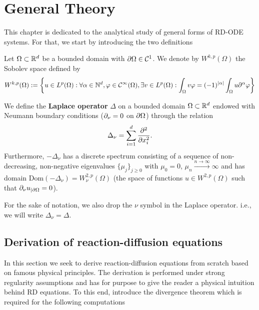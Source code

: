 \section{General Theory}

This chapter is dedicated to the analytical study of general forms of RD-ODE systems. For that, we start by introducing the two definitions

\begin{definition}
	Let $\Omega \subset \mathbb{R}^d$ be a bounded domain with $\partial \Omega \in \mathcal C^1$. We denote by $W^{k, p}(\Omega)$ the Sobolev space defined by
	$$W^{k, p}(\Omega) := \left\{ u \in L^p(\Omega) : \forall \alpha \in \mathbb{N}^d, \varphi \in \mathcal C^\infty(\Omega), \exists v \in L^p(\Omega) : \int_\Omega v \varphi = (-1)^{|\alpha|} \int_\Omega u \partial^\alpha \varphi \right\}$$   
\end{definition}

\begin{definition}
	
	We define the \textbf{Laplace operator}  $\Delta$ on a bounded domain $\Omega \subset \mathbb{R}^d$ endowed with Neumann boundary conditions ($\partial_{\nu} = 0$ on $\partial\Omega$) through the relation
	$$\Delta_\nu = \sum_{i=1}^d \frac{\partial^2}{\partial x_i^2}.$$
	Furthermore, $-\Delta_\nu$ has a discrete spectrum consisting of a sequence of non-decreasing, non-negative eigenvalues 
	$\{\mu_j\}_{j\ge 0}$ with $\mu_0 = 0$, $\mu_n \xrightarrow{n \to \infty} \infty$ and has domain $\mathrm{Dom}(-\Delta_\nu) = W_\nu^{2,p}(\Omega)$ (the space of functions $u\in W^{2,p}(\Omega)$ such that $\partial_\nu u_{\vert \partial\Omega} = 0$).
\end{definition}

For the sake of notation, we also  drop the $\nu$ symbol in the Laplace operator. i.e., we will write $\Delta_\nu = \Delta$. 

\subsection{Derivation of reaction-diffusion equations}


In this section we seek to derive reaction-diffusion equations from scratch based on famous physical principles. The derivation is performed under strong regularity assumptions and has for purpose to give the reader a physical intuition behind RD equations. To this end, introduce the divergence theorem which is required for the following computations  

